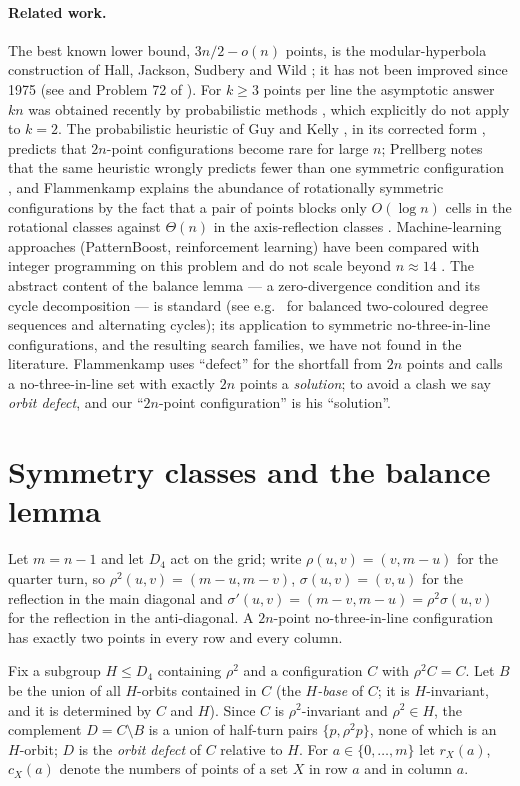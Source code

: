 \documentclass[11pt]{article}
\theoremstyle{remark}
\newcommand{\rot}{\rho}
\newcommand{\Dfour}{D_4}
\begin{document}
\paragraph{Related work.}
The best known lower bound, $3n/2-o(n)$ points, is the modular-hyperbola construction of Hall, Jackson, Sudbery and Wild
\cite{HJSW75}; it has not been improved since 1975 (see \cite{KNS25,GGGKKP26} and Problem 72 of \cite{Green}).  For $k\ge3$
points per line the asymptotic answer $kn$ was obtained recently by probabilistic methods \cite{KNS25,GGGKKP26}, which
explicitly do not apply to $k=2$.  The probabilistic heuristic of Guy and Kelly \cite{GuyKelly}, in its corrected form
\cite{Voutier26,Prellberg26}, predicts that $2n$-point configurations become rare for large $n$; Prellberg notes that the same
heuristic wrongly predicts fewer than one symmetric configuration \cite{Prellberg26}, and Flammenkamp explains the abundance
of rotationally symmetric configurations by the fact that a pair of points blocks only $O(\log n)$ cells in the rotational
classes against $\Theta(n)$ in the axis-reflection classes \cite{FlammenkampDB}.  Machine-learning approaches (PatternBoost,
reinforcement learning) have been compared with integer programming on this problem and do not scale beyond $n\approx14$
\cite{RJPDP25}.  The abstract content of the balance lemma --- a zero-divergence condition and its cycle decomposition --- is
standard (see e.g.\ \cite{EKM} for balanced two-coloured degree sequences and alternating cycles); its application to
symmetric no-three-in-line configurations, and the resulting search families, we have not found in the literature.
Flammenkamp uses ``defect'' for the shortfall from $2n$ points and calls a no-three-in-line set with exactly $2n$ points a
\emph{solution}; to avoid a clash we say \emph{orbit defect}, and our ``$2n$-point configuration'' is his ``solution''.

\section{Symmetry classes and the balance lemma}\label{sec:lemma}
Let $m=n-1$ and let $\Dfour$ act on the grid; write $\rot(u,v)=(v,m-u)$ for the quarter turn, so $\rot^2(u,v)=(m-u,m-v)$,
$\sigma(u,v)=(v,u)$ for the reflection in the main diagonal and $\sigma'(u,v)=(m-v,m-u)=\rot^2\sigma(u,v)$ for the reflection
in the anti-diagonal.  A $2n$-point no-three-in-line configuration has exactly two points in every row and every column.

Fix a subgroup $H\le\Dfour$ containing $\rot^2$ and a configuration $C$ with $\rot^2C=C$.  Let $B$ be the union of all
$H$-orbits contained in $C$ (the \emph{$H$-base} of $C$; it is $H$-invariant, and it is determined by $C$ and $H$).  Since
$C$ is $\rot^2$-invariant and $\rot^2\in H$, the complement $D=C\setminus B$ is a union of half-turn pairs
$\{p,\rot^2p\}$, none of which is an $H$-orbit; $D$ is the \emph{orbit defect} of $C$ relative to $H$.  For
$a\in\{0,\dots,m\}$ let $r_X(a)$, $c_X(a)$ denote the numbers of points of a set $X$ in row $a$ and in column $a$.
\end{document}
